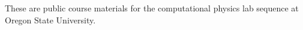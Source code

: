 These are public course materials for the computational physics lab sequence at Oregon State University.